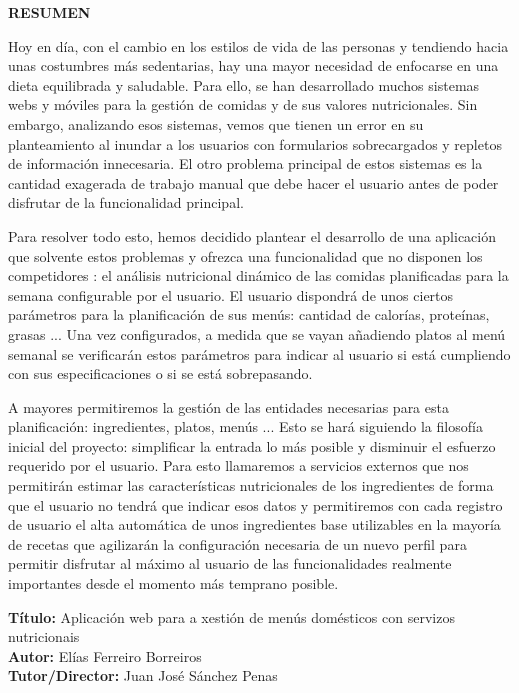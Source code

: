 \documentclass[12pt, a4paper, twoside]{book}
\begin{document}
	\begin{center}
		\LARGE{\textbf{ RESUMEN }}	
	\end{center}
	Hoy en día, con el cambio en los estilos de vida de las personas y tendiendo hacia unas costumbres más sedentarias, hay una mayor necesidad de enfocarse en una dieta equilibrada y saludable.
	Para ello, se han desarrollado muchos sistemas webs y móviles para la gestión de comidas y de sus valores nutricionales.	Sin embargo, analizando esos sistemas, vemos que tienen un error en su planteamiento al inundar a los usuarios con formularios sobrecargados y repletos de información innecesaria. 
	El otro problema principal de estos sistemas es la cantidad exagerada de trabajo manual que debe hacer el usuario antes de poder disfrutar de la funcionalidad principal. 

	Para resolver todo esto, hemos decidido plantear el desarrollo de una aplicación que solvente estos problemas y ofrezca una funcionalidad que no disponen los competidores : el análisis nutricional dinámico de las comidas planificadas para la semana configurable por el usuario.
	El usuario dispondrá de unos ciertos parámetros para la planificación de sus menús: cantidad de calorías, proteínas, grasas ...
	Una vez configurados, a medida que se vayan añadiendo platos al menú semanal se verificarán estos parámetros para indicar al usuario si está cumpliendo con sus especificaciones o si se está sobrepasando.

	A mayores permitiremos la gestión de las entidades necesarias para esta planificación: ingredientes, platos, menús ... 
	Esto se hará siguiendo la filosofía inicial del proyecto: simplificar la entrada lo más posible y disminuir el esfuerzo requerido por el usuario. 
	Para esto llamaremos a servicios externos que nos permitirán estimar las características nutricionales de los ingredientes de forma que el usuario no tendrá que indicar esos datos y permitiremos con cada registro de usuario el alta automática de unos ingredientes base utilizables en la mayoría de recetas que agilizarán la configuración necesaria de un nuevo perfil para permitir disfrutar al máximo al usuario de las funcionalidades realmente importantes desde el momento más temprano posible.
	
	\clearpage
	
	\textbf{Título:} Aplicación web para a xestión de menús domésticos con servizos nutricionais
	\\
	\textbf{Autor:} Elías Ferreiro Borreiros
	\\
	\textbf{Tutor/Director:} Juan José Sánchez Penas
	
\end{document}
